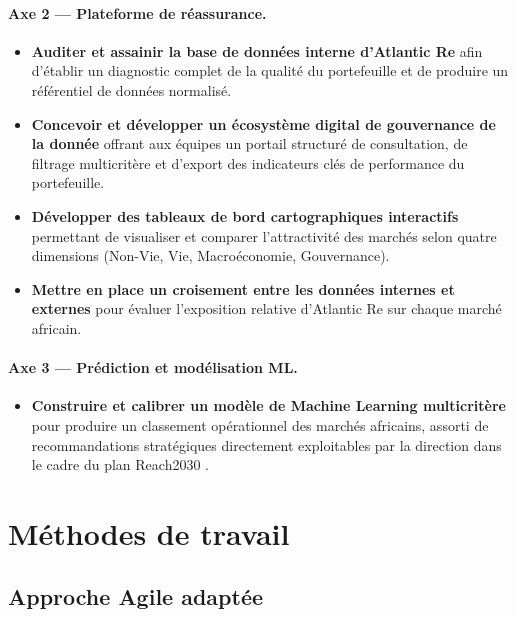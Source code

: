 \documentclass[12pt,a4paper]{report}
\begin{document}
\paragraph{Axe 2 --- Plateforme de réassurance.}
\begin{itemize}[leftmargin=1.5cm, itemsep=6pt]
  \item \textbf{Auditer et assainir la base de données interne d'Atlantic Re} afin d'établir un diagnostic complet de la qualité du portefeuille et de produire un référentiel de données normalisé.
  \item \textbf{Concevoir et développer un écosystème digital de gouvernance de la donnée} offrant aux équipes un portail structuré de consultation, de filtrage multicritère et d'export des indicateurs clés de performance du portefeuille.
  \item \textbf{Développer des tableaux de bord cartographiques interactifs} permettant de visualiser et comparer l'attractivité des marchés selon quatre dimensions (Non-Vie, Vie, Macroéconomie, Gouvernance).
  \item \textbf{Mettre en place un croisement entre les données internes et externes} pour évaluer l'exposition relative d'Atlantic Re sur chaque marché africain.
\end{itemize}

\paragraph{Axe 3 --- Prédiction et modélisation ML.}
\begin{itemize}[leftmargin=1.5cm, itemsep=6pt]
  \item \textbf{Construire et calibrer un modèle de Machine Learning multicritère} pour produire un classement opérationnel des marchés africains, assorti de recommandations stratégiques directement exploitables par la direction dans le cadre du plan Reach2030 .
\end{itemize}





\section{Méthodes de travail}

\subsection{Approche Agile adaptée}
\end{document}
